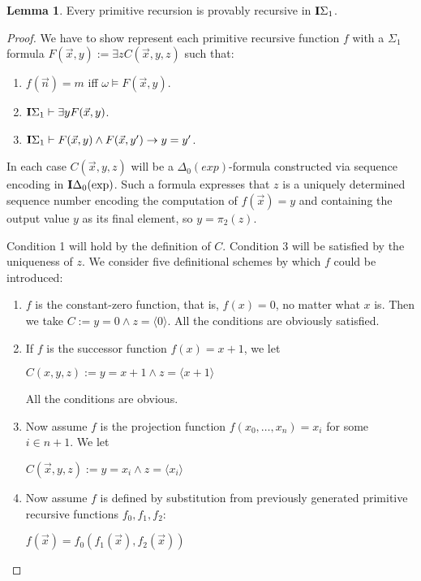 \documentclass[8pt]{article}
\theoremstyle{definition}
\theoremstyle{definition}
\theoremstyle{definition}
\theoremstyle{definition}
\theoremstyle{definition}
\theoremstyle{definition}
\theoremstyle{definition}
\theoremstyle{definition}
\newtheorem{lemma}{Lemma}[section]
\theoremstyle{definition}
\theoremstyle{definition}
\theoremstyle{definition}
\theoremstyle{definition}
\theoremstyle{definition}
\theoremstyle{question}
\begin{document}
\begin{lemma}
  Every primitive recursion is provably recursive in ${\bf I}\Sigma_1$.
\end{lemma}

\begin{proof}
  We have to show represent each primitive recursive function $f$ with a $\Sigma_1$ formula 
  $F(\vec{x}, y) := \exists z C(\vec{x}, y, z)$ such that:
  \begin{enumerate}
    \item $f(\vec{n}) = m$ iff $\omega \models F(\vec{x}, y)$.
    \item ${\bf I}\Sigma_1 \vdash \exists y F(\vec{x}, y)$.
    \item ${\bf I}\Sigma_1 \vdash F(\vec{x}, y) \land F(\vec{x}, y') \to y = y'$.
  \end{enumerate}

  In each case $C(\vec{x}, y, z)$ will be a $\Delta_0(exp)$-formula
  constructed via sequence encoding in ${\bf I}\Delta_0(\operatorname{exp})$.
  Such a formula expresses that $z$ is a uniquely determined sequence number encoding the computation of
  $f(\vec{x}) = y$ and containing the output value $y$ as its final element, so $y = \pi_2(z)$.

  Condition 1 will hold by the definition of $C$. 
  Condition 3 will be satisfied by the uniqueness of $z$. We consider five definitional schemes by which $f$ could be
  introduced:
  \begin{enumerate}
    \item $f$ is the constant-zero function, that is, $f(x) = 0$, no matter what $x$ is.
    Then we take $C := y = 0 \land z = \langle 0 \rangle$. All the conditions are obviously satisfied.
    \item If $f$ is the successor function $f(x) = x + 1$, we let
    \begin{center}
      $C(x,y,z) := y = x + 1 \land z = \langle x + 1 \rangle$
    \end{center}
    All the conditions are obvious.
    \item Now assume $f$ is the projection function $f(x_0, \dots, x_n) = x_i$ for some $i \in n + 1$.
    We let
    \begin{center}
      $C(\vec{x},y,z) := y = x_i \land z = \langle x_i \rangle$
    \end{center}
    \item Now assume $f$ is defined by substitution from previously generated primitive recursive functions $f_0, f_1, f_2$:
    \begin{center}
      $f(\vec{x}) = f_0(f_1(\vec{x}), f_2(\vec{x}))$
    \end{center}


\end{enumerate}
\end{proof}
\end{document}
